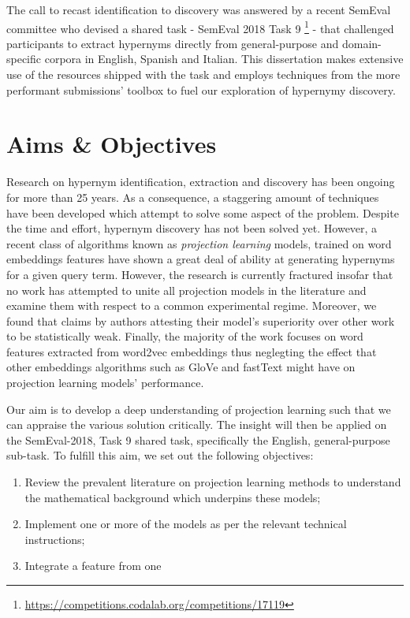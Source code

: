 The call to recast identification to discovery was answered by a recent SemEval committee who devised a shared task - SemEval 2018 Task 9 \footnote{\url{https://competitions.codalab.org/competitions/17119}} - that challenged participants to extract hypernyms directly from general-purpose and domain-specific corpora in English, Spanish and Italian.  This dissertation makes extensive use of the resources shipped with the task and employs techniques from the more performant submissions’ toolbox to fuel our exploration of hypernymy discovery. 

\section{Aims \& Objectives}
Research on hypernym identification, extraction and discovery has been ongoing for more than 25 years.  As a consequence, a staggering amount of techniques have been developed which attempt to solve some aspect of the problem.  Despite the time and effort, hypernym discovery has not been solved yet.  However, a recent class of algorithms known as \textit{projection learning} models, trained on word embeddings features have shown a great deal of ability at generating hypernyms for a given query term.  However, the research is currently fractured insofar that no work has attempted to unite all projection models in the literature and examine them with respect to a common experimental regime.  Moreover, we found that claims by authors attesting their model's superiority over other work to be statistically weak. Finally, the majority of the work focuses on word features extracted from word2vec embeddings thus neglegting the effect that other embeddings algorithms such as GloVe and fastText might have on projection learning models' performance.

Our aim is to develop a deep understanding of projection learning such that we can appraise the various solution critically.  The insight will then be applied on the SemEval-2018, Task 9 shared task, specifically the English, general-purpose sub-task.  To fulfill this aim, we set out the following objectives:
\begin{enumerate}
    \item Review the prevalent literature on projection learning methods to understand the mathematical background which underpins these models;
    \item Implement one or more of the models as per the relevant technical instructions;
    \item Integrate a feature from one 
\end{enumerate}



